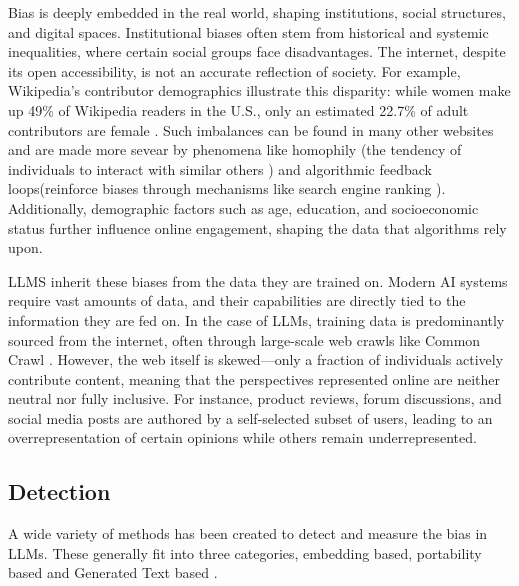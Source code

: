 Bias is deeply embedded in the real world, shaping institutions, social structures, and digital spaces. Institutional biases often stem from historical and systemic inequalities, where certain social groups face disadvantages. The internet, despite its open accessibility, is not an accurate reflection of society. For example, Wikipedia's contributor demographics illustrate this disparity: while women make up 49\% of Wikipedia readers in the U.S., only an estimated 22.7\% of adult contributors are female \cite{hill2013wikipedia}. Such imbalances can be found in many other websites and are made more sevear by phenomena like homophily (the tendency of individuals to interact with similar others \cite{karimi2018homophily}) and algorithmic feedback loops(reinforce biases through mechanisms like search engine ranking \cite{lerman2014leveraging}). Additionally, demographic factors such as age, education, and socioeconomic status further influence online engagement, shaping the data that algorithms rely upon.

LLMS inherit these biases from the data they are trained on. Modern AI systems require vast amounts of data, and their capabilities are directly tied to the information they are fed on. In the case of LLMs, training data is predominantly sourced from the internet, often through large-scale web crawls like Common Crawl \cite{brown2020language}. However, the web itself is skewed—only a fraction of individuals actively contribute content, meaning that the perspectives represented online are neither neutral nor fully inclusive. For instance, product reviews, forum discussions, and social media posts are authored by a self-selected subset of users, leading to an overrepresentation of certain opinions while others remain underrepresented.

\subsection{Detection}


A wide variety of methods has been created to detect and measure the bias in LLMs. These generally fit into three categories, embedding based, portability based and Generated Text based \cite{gallegos_bias_2024}.


